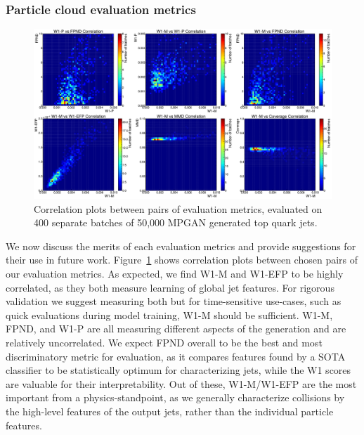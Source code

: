 \subsubsection{Particle cloud evaluation metrics}

\begin{figure}[htpb]
    \centering
    \centerline{
    \includegraphics[width=\textwidth]{figures/04-ML4Sim/mpgan/correlation_plots.pdf}}
    \caption{Correlation plots between pairs of evaluation metrics, evaluated on 400 separate batches of 50,000 MPGAN generated top quark jets.
    }
    \label{fig:04_mpgan_correlation}
\end{figure}

We now discuss the merits of each evaluation metrics and provide suggestions for their use in future work. Figure~\ref{fig:04_mpgan_correlation} shows correlation plots between chosen pairs of our evaluation metrics.
As expected, we find W1-M and W1-EFP to be highly correlated,  as they both measure learning of global jet features. 
For rigorous validation we suggest measuring both but for time-sensitive use-cases, such as quick evaluations during model training, W1-M should be sufficient. 
W1-M, FPND, and W1-P are all measuring different aspects of the generation and are relatively uncorrelated. 
We expect FPND overall to be the best and most discriminatory metric for evaluation, as it compares features found by a SOTA classifier to be statistically optimum for characterizing jets, while the W1 scores are valuable for their interpretability. 
Out of these, W1-M/W1-EFP are the most important from a physics-standpoint, as we generally characterize collisions by the high-level features of the output jets, rather than the individual particle features. 

